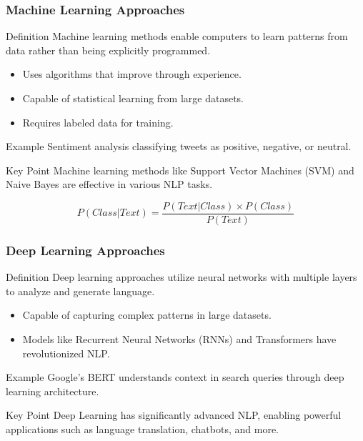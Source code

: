 \documentclass{beamer}
\begin{document}
\begin{frame}[fragile]
    \frametitle{Machine Learning Approaches}
    \begin{block}{Definition}
        Machine learning methods enable computers to learn patterns from data rather than being explicitly programmed.
    \end{block}
    \begin{itemize}
        \item Uses algorithms that improve through experience.
        \item Capable of statistical learning from large datasets.
        \item Requires labeled data for training.
    \end{itemize}
    \begin{block}{Example}
        Sentiment analysis classifying tweets as positive, negative, or neutral.
    \end{block}
    \begin{block}{Key Point}
        Machine learning methods like Support Vector Machines (SVM) and Naive Bayes are effective in various NLP tasks.
    \end{block}
    \begin{equation}
        P(Class|Text) = \frac{P(Text|Class) \times P(Class)}{P(Text)}
    \end{equation}
\end{frame}

\begin{frame}[fragile]
    \frametitle{Deep Learning Approaches}
    \begin{block}{Definition}
        Deep learning approaches utilize neural networks with multiple layers to analyze and generate language.
    \end{block}
    \begin{itemize}
        \item Capable of capturing complex patterns in large datasets.
        \item Models like Recurrent Neural Networks (RNNs) and Transformers have revolutionized NLP.
    \end{itemize}
    \begin{block}{Example}
        Google’s BERT understands context in search queries through deep learning architecture.
    \end{block}
    \begin{block}{Key Point}
        Deep Learning has significantly advanced NLP, enabling powerful applications such as language translation, chatbots, and more.
    \end{block}
\end{frame}
\end{document}
